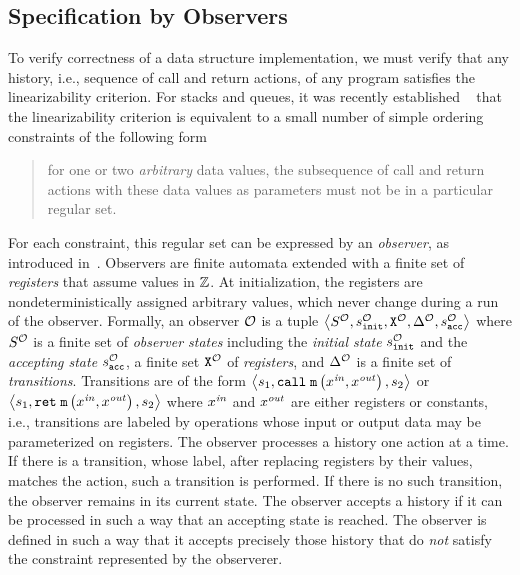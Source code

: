 \subsection{Specification by Observers}
To verify correctness of a data structure implementation,
we must verify that any history, i.e., sequence of call and return actions,
of any program satisfies the linearizability criterion.
For stacks and queues, it was recently established
~\cite{BEEH:icalp15} that the linearizability criterion is equivalent to
a small number of simple ordering constraints of the following form
\begin{quote}
for one or two {\em arbitrary} data values, the subsequence of
call and return actions with these data values as parameters must not be
in a particular regular set.
\end{quote}
For each constraint, this regular set can be expressed by an {\em observer},
as introduced in~\cite{AHHR:integrated}. 
%
Observers are
finite automata extended with a finite set of {\em registers}
that assume values in ${\mathbb Z}$. 
%
%
At initialization,
the registers are nondeterministically
assigned arbitrary values, which never change
during a run of the observer. 
%
Formally, an observer ${\mathcal O}$ is a tuple
$\left\langle S^{\mathcal O},s^{\mathcal O}_{\tt init},{\tt X}^{{\mathcal O}},\Delta^{\mathcal O},s^{\mathcal O}_{\tt acc}\right\rangle$ where $S^{\mathcal O}$ is a finite set 
of {\it observer states} including the 
{\it initial state} $s^{\mathcal O}_{\tt init}$ and
the {\it accepting state} $s^{\mathcal O}_{\tt acc}$, 
a finite set ${\tt X}^{{\mathcal O}}$  
of {\it registers}, and $\Delta^{\mathcal O}$ is a finite
set of {\it transitions}.
%
%
Transitions are of the form 
$\left\langle s_1,\mathtt{call}\; {\tt m}\left(x^{\it in},x^{\it out}\right),s_2\right\rangle$ or
$\left\langle s_1,\mathtt{ret}\; {\tt m}\left(x^{\it in},x^{\it out}\right),s_2\right\rangle$
where $x^{\it in}$ and $x^{\it out}$ are either registers or constants, i.e.,
transitions are labeled by 
operations whose input or output data may be parameterized on registers.
The observer processes a history one action at a time.
%
If there is a transition, whose label, after replacing registers by their
values, matches the action, such a transition is performed. 
%
If there is no
such transition, the observer remains in its current state.
The observer accepts a history if it can  be processed in such a way that
an accepting state is reached.
%
The observer is defined in such a way that it accepts precisely those
history that do {\em not} satisfy the constraint represented by the observerer.
%











